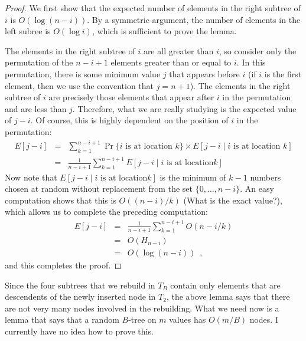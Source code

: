 \documentclass[lotsofwhite,charterfonts]{patmorin}
\begin{document}
\begin{proof}
We first show that the expected number of elements in the right
subtree of $i$ is $O(\log (n-i))$.  By a symmetric argument, the
number of elements in the left subree is $O(\log i)$, which is
sufficient to prove the lemma.

The elements in the right subtree of $i$ are all greater than $i$, so
consider only the permutation of the $n-i+1$ elements greater than or
equal to $i$.  In this permutation, there is some minimum value $j$
that appears before $i$ (if $i$ is the first element, then we use the
convention that $j=n+1$).  The elements in the right subtree of $i$
are precisely those elements that appear after $i$ in the permutation
and are less than $j$.  Therefore, what we are really studying is the
expected value of $j-i$.  Of course, this is highly dependent on the
position of $i$ in the permutation: \begin{eqnarray*} E[j-i] & = &
\sum_{k=1}^{n-i+1} \Pr\{\mbox{$i$ is at location $k$}\} \times
E[j-i\mid\mbox{$i$ is at location $k$}] \\ & = &
\frac{1}{n-i+1}\sum_{k=1}^{n-i+1} E[j-i\mid\mbox{$i$ is at location
$k$}] \end{eqnarray*} Now note that $E[j-i\mid\mbox{$i$ is at location
$k$}]$ is the minimum of $k-1$ numbers chosen at random without
replacement from the set $\{0,\ldots,n-i\}$.  An easy computation
shows that this is $O((n-i)/k)$ (What is the exact value?), which
allows us to complete the preceding computation: \begin{eqnarray*}
E[j-i] & = & \frac{1}{n-i+1}\sum_{k=1}^{n-i+1} O(n-i/k) \\ & = &
O(H_{n-i}) \\ & = & O(\log (n-i)) \enspace , \end{eqnarray*} and this
completes the proof.  \end{proof}


Since the four subtrees that we rebuild in $T_B$ contain only elements
that are descendents of the newly inserted node in $T_2$, the above
lemma says that there are not very many nodes involved in the
rebuilding.  What we need now is a lemma that says that a random
$B$-tree on $m$ values has $O(m/B)$ nodes.  I currently have no idea
how to prove this.
\end{document}
